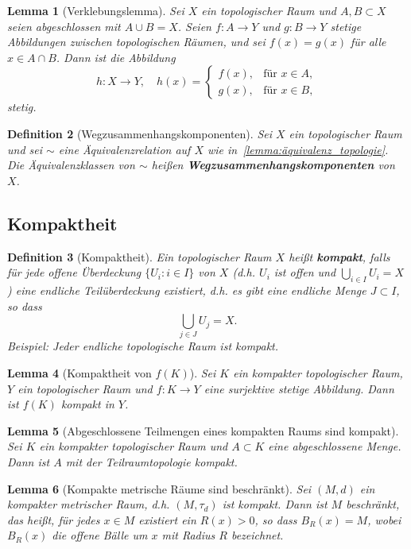 \documentclass[a4paper,12pt]{article}
\theoremstyle{break}
\newtheorem{definition}{Definition}[section]
\newtheorem{lemma}[definition]{Lemma}
\begin{document}
\begin{lemma}[Verklebungslemma]
Sei $X$ ein topologischer Raum und $A, B \subset X$ seien abgeschlossen mit $A \cup B = X$. Seien $f : A \to Y$ und $g : B \to Y$ stetige Abbildungen zwischen topologischen Räumen, und sei $f(x) = g(x)$ für alle $x \in A \cap B$. Dann ist die Abbildung
\[
h : X \to Y, \quad h(x) = 
\begin{cases} 
f(x), & \text{für } x \in A, \\
g(x), & \text{für } x \in B,
\end{cases}
\]
stetig.
\end{lemma}

\begin{definition}[Wegzusammenhangskomponenten]
Sei $X$ ein topologischer Raum und sei $\sim$ eine Äquivalenzrelation auf $X$ wie in~\ref{lemma:äquivalenz_topologie}. Die Äquivalenzklassen von $\sim$ heißen \textbf{Wegzusammenhangskomponenten} von $X$.
\end{definition}

\subsection{Kompaktheit}

\begin{definition}[Kompaktheit]
Ein topologischer Raum $X$ heißt \textbf{kompakt}, falls für jede offene Überdeckung $\{U_i : i \in I\}$ von $X$ (d.h. $U_i$ ist offen und $\bigcup_{i \in I} U_i = X$) eine endliche Teilüberdeckung existiert, d.h. es gibt eine endliche Menge $J \subset I$, so dass
\[
\bigcup_{j \in J} U_j = X.
\]
Beispiel: Jeder endliche topologische Raum ist kompakt.
\end{definition}

\begin{lemma}[Kompaktheit von $f(K)$]
Sei $K$ ein kompakter topologischer Raum, $Y$ ein topologischer Raum und $f : K \to Y$ eine surjektive stetige Abbildung. Dann ist $f(K)$ kompakt in $Y$.
\end{lemma}

\begin{lemma}[Abgeschlossene Teilmengen eines kompakten Raums sind kompakt]
Sei $K$ ein kompakter topologischer Raum und $A \subset K$ eine abgeschlossene Menge. Dann ist $A$ mit der Teilraumtopologie kompakt.
\end{lemma}

\begin{lemma}[Kompakte metrische Räume sind beschränkt]
Sei $(M, d)$ ein kompakter metrischer Raum, d.h. $(M, \tau_d)$ ist kompakt. Dann ist $M$ beschränkt, das heißt, für jedes $x \in M$ existiert ein $R(x) > 0$, so dass $B_R(x) = M$, wobei $B_R(x)$ die offene Bälle um $x$ mit Radius $R$ bezeichnet.
\end{lemma}
\end{document}

